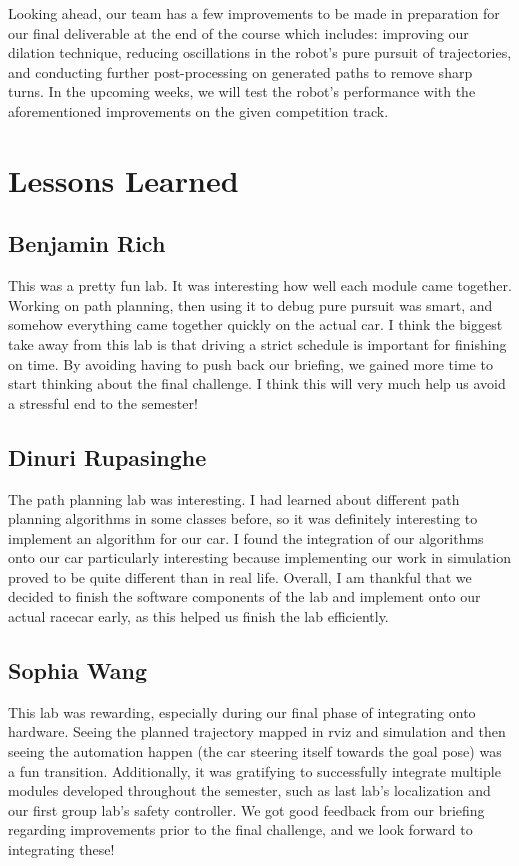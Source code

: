 \documentclass{article}
\begin{document}
Looking ahead, our team has a few improvements to be made in preparation for our final deliverable at the end of the course which includes: improving our dilation technique, reducing oscillations in the robot's pure pursuit of trajectories, and conducting further post-processing on generated paths to remove sharp turns. In the upcoming weeks, we will test the robot's performance with the aforementioned improvements on the given competition track.

\section{Lessons Learned}

\subsection{Benjamin Rich}
This was a pretty fun lab. It was interesting how well each module came together. Working on path planning, then using it to debug pure pursuit was smart, and somehow everything came together quickly on the actual car. I think the biggest take away from this lab is that driving a strict schedule is important for finishing on time. By avoiding having to push back our briefing, we gained more time to start thinking about the final challenge. I think this will very much help us avoid a stressful end to the semester!

\subsection{Dinuri Rupasinghe}
The path planning lab was interesting. I had learned about different path planning algorithms in some classes before, so it was definitely interesting to implement an algorithm for our car. I found the integration of our algorithms onto our car particularly interesting because implementing our work in simulation proved to be quite different than in real life. Overall, I am thankful that we decided to finish the software components of the lab and implement onto our actual racecar early, as this helped us finish the lab efficiently.

\subsection{Sophia Wang}
This lab was rewarding, especially during our final phase of integrating onto hardware. Seeing the planned trajectory mapped in rviz and simulation and then seeing the automation happen (the car steering itself towards the goal pose) was a fun transition. Additionally, it was gratifying to successfully integrate multiple modules developed throughout the semester, such as last lab's localization and our first group lab's safety controller. We got good feedback from our briefing regarding improvements prior to the final challenge, and we look forward to integrating these!
\end{document}
